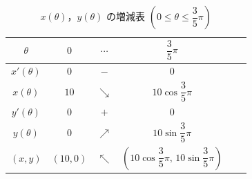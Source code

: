 \documentclass[../../main.tex]{subfiles}
\begin{document}
\begin{table}[htb]
  \centering
  \caption{$x(\theta)$，$y(\theta)$ の増減表 $\left(0 \le \theta \le \dfrac{3}{5}\pi\right)$}
  \label{tab:hypocycloid_monotonicity}
  \renewcommand{\arraystretch}{1.5}
  \begin{tabular}{|c|ccccc|}
    \hline
    $\theta$   & $0$        & $\cdots$    & $\dfrac{3}{5}\pi$ \\ \hline
    $x'(\theta)$ & $0$      & $-$         & $0$               \\ \hline
    $x(\theta)$  & $10$     & $\searrow$  & $10\cos\dfrac{3}{5}\pi$ \\ \hline
    $y'(\theta)$ & $0$      & $+$         & $0$               \\ \hline
    $y(\theta)$  & $0$      & $\nearrow$  & $10\sin\dfrac{3}{5}\pi$ \\ \hline
    $(x, y)$     & $(10, 0)$ & $\nwarrow$ & $\left(10\cos\dfrac{3}{5}\pi, \, 10\sin\dfrac{3}{5}\pi\right)$ \\ \hline
  \end{tabular}
\end{table}
\end{document}

